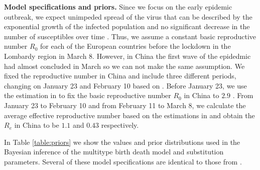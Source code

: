 \textbf{Model specifications and priors.} 
Since we focus on the early epidemic outbreak, we expect unimpeded spread of the virus that can be described by the exponential growth of the infected population and no significant decrease in the number of susceptibles over time \cite{Boskova2014}. Thus, we assume a constant basic reproductive number $R_0$ for each of the European countries before the lockdown in the Lombardy region in March 8. However, in China the first wave of the epidedmic had almost concluded in March so we can not make the same assumption. We fixed the reproductive number in China and include three different periods, changing on January 23 and February 10 based on \cite{Pan2020} \cite{Wu2020} \cite{Xiao2020}. Before January 23, we use the estimation in \cite{Park2020} \cite{Billah2020} to fix the basic reproductive number $R_0$ in China to $2.9$ . From January 23 to February 10 and from February 11 to March 8, we calculate the average effective reproductive number based on the estimations in \cite{covidre} \cite{Huisman2020} and obtain the $R_e$ in China to be $1.1$ and $0.43$ respectively.   

In Table \ref{table:priors} we show the values and prior distributions used in the Bayesian inference of the multitype birth death model and substitution parameters. Several of these model specifications are identical to those from \cite{Nadeau2020}.

